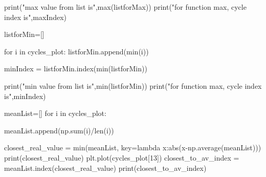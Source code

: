 \begin{python}
print("max value from list is",max(listforMax))
print("for function max, cycle index is",maxIndex)


listforMin=[]

for i in cycles_plot:
    listforMin.append(min(i))
    
minIndex = listforMin.index(min(listforMin))

print("min value from list is",min(listforMin))
print("for function max, cycle index is",minIndex)

meanList=[]
for i in cycles_plot:

    meanList.append(np.sum(i)/len(i))
    
closest_real_value = min(meanList, key=lambda x:abs(x-np.average(meanList)))
print(closest_real_value)
plt.plot(cycles_plot[13])
closest_to_av_index = meanList.index(closest_real_value)
print(closest_to_av_index)

\end{python}